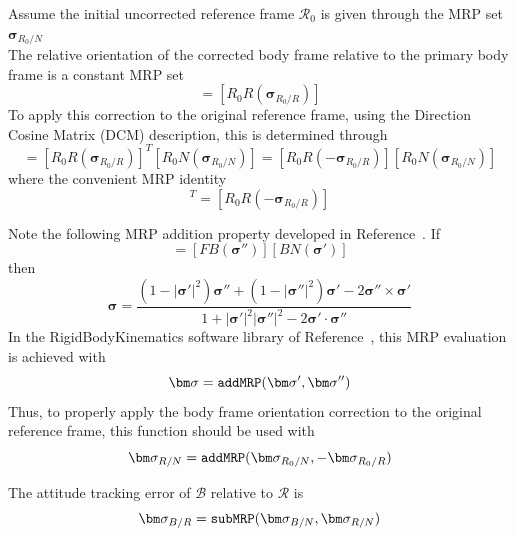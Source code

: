Assume the initial uncorrected reference frame $\mathcal{R}_{0}$ is given through the MRP set $\bm\sigma_{R_{0}/N}$
\begin{equation}
	[R_{0}N(	\bm\sigma_{R_{0}/N})]
\end{equation}
The relative orientation of the corrected body frame relative to the primary body frame is a constant MRP set
\begin{equation}
	[B_{c}B(\bm\sigma_{B_{c}/B})] = [R_{0}R(\bm\sigma_{R_{0}/R})]
\end{equation}
To apply this correction to the original reference frame, using the Direction Cosine Matrix (DCM) description, this is determined through
\begin{equation}
	[RN(\bm\sigma_{R/N})] = [R_{0}R(\bm\sigma_{R_{0}/R})]^{T} [R_{0}N(\bm\sigma_{R_{0}/N})] =
	[R_{0}R(-\bm\sigma_{R_{0}/R})] [R_{0}N(\bm\sigma_{R_{0}/N})]
\end{equation}
where the convenient MRP identity
\begin{equation}
	 [R_{0}R(\bm\sigma_{R_{0}/R})]^{T} = [R_{0}R(-\bm\sigma_{R_{0}/R})]
\end{equation}

Note the following MRP addition property developed in Reference~.  If
\begin{equation}
	[BN(\bm\sigma)] = [FB(\bm\sigma '')] [ BN(\bm\sigma ')]
\end{equation}
then
\begin{equation}
	\bm\sigma = \frac{
		(1-|\bm\sigma'|^{2})\bm\sigma '' + (1-|\bm\sigma ''|^{2}) \bm\sigma ' - 2 \bm\sigma '' \times \bm\sigma '
	}{
		1 + |\bm\sigma '|^{2} |\bm\sigma''|^{2} - 2 \bm\sigma' \cdot \bm\sigma''
	}
\end{equation}
In the RigidBodyKinematics software library of Reference~, this MRP evaluation is achieved with
\begin{equation}
	\bm\sigma = {\tt addMRP}(\bm\sigma ', \bm\sigma'')
\end{equation}
Thus, to properly apply the body frame orientation correction to the original reference frame, this function should be used with
\begin{equation}
	\bm\sigma_{R/N} = {\tt addMRP}(\bm\sigma_{R_{0}/N}, -\bm\sigma_{R_{0}/R})
\end{equation}

The attitude tracking error of $\mathcal{B}$ relative to $\mathcal{R}$ is
\begin{equation}
	\bm\sigma_{B/R} = {\tt subMRP}(\bm\sigma_{B/N}, \bm\sigma_{R/N})
\end{equation}




